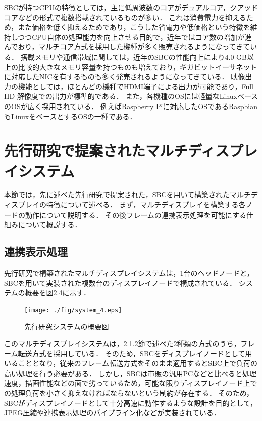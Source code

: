 SBCが持つCPUの特徴としては，主に低周波数のコアがデュアルコア，クアッドコアなどの形式で複数搭載されているものが多い．
これは消費電力を抑えるため，また価格を低く抑えるためであり，こうした省電力や低価格という特徴を維持しつつCPU自体の処理能力を向上させる目的で，近年ではコア数の増加が進んでおり，マルチコア方式を採用した機種が多く販売されるようになってきている．
搭載メモリや通信帯域に関しては，近年のSBCの性能向上により4.0 GB以上の比較的大きなメモリ容量を持つものも増えており，ギガビットイーサネットに対応したNICを有するものも多く発売されるようになってきている．
映像出力の機能としては，ほとんどの機種でHDMI端子による出力が可能であり，Full HD 解像度での出力が標準的である．
また，各機種のOSには軽量なLinuxベースのOSが広く採用されている．
例えばRaspberry Piに対応したOSであるRaspbian \cite{raspbian}もLinuxをベースとするOSの一種である．



\section{先行研究で提案されたマルチディスプレイシステム}

本節では，先に述べた先行研究で提案された，SBCを用いて構築されたマルチディスプレイの特徴について述べる．
まず，マルチディスプレイを構築する各ノードの動作について説明する．
その後フレームの連携表示処理を可能にする仕組みについて概説する．

\subsection{連携表示処理}

先行研究で構築されたマルチディスプレイシステムは，1台のヘッドノードと，SBCを用いて実装された複数台のディスプレイノードで構成されている．
システムの概要を図2.4に示す．

\begin{figure}[H]
  \hspace*{\fill}
  \texttt{[image: ./fig/system\_4.eps]}
  \hspace*{\fill}
  \label{fig_2.4}
  \caption{先行研究システムの概要図}
 \end{figure}

このマルチディスプレイシステムは，2.1.2節で述べた2種類の方式のうち，フレーム転送方式を採用している．
そのため，SBCをディスプレイノードとして用いることとなり，従来のフレーム転送方式をそのまま適用するとSBC上で負荷の高い処理を行う必要がある．
しかし，SBCは市販の汎用PCなどと比べると処理速度，描画性能などの面で劣っているため，可能な限りディスプレイノード上での処理負荷を小さく抑えなければならないという制約が存在する．
そのため，SBCがディスプレイノードとして十分高速に動作するような設計を目的として，JPEG圧縮や連携表示処理のパイプライン化などが実装されている．

